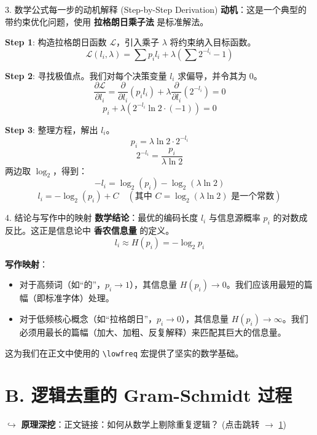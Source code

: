 \documentclass[11pt, a4paper]{ctexart}
\newcommand{\lowfreq}[1]{%
	{\Large\bfseries\color{red!60!black} #1}%
}
\newcommand{\mathlink}[2]{%
	\par\noindent\hspace*{2em}\small\color{blue!60!black}
	$\hookrightarrow$ \textbf{原理深挖}：#2 (点击跳转 $\to$ \ref{#1})
}
\begin{document}
	\newpage
	
	\begin{mathbox}{3. 数学公式每一步的动机解释 (Step-by-Step Derivation)}
		\textbf{动机}：这是一个典型的带约束优化问题，使用\lowfreq{拉格朗日乘子法}是标准解法。
		
		\textbf{Step 1}: 构造拉格朗日函数 $\mathcal{L}$，引入乘子 $\lambda$ 将约束纳入目标函数。
		$$ \mathcal{L}(l_i, \lambda) = \sum p_i l_i + \lambda \left( \sum 2^{-l_i} - 1 \right) $$
		
		\textbf{Step 2}: 寻找极值点。我们对每个决策变量 $l_i$ 求偏导，并令其为 0。
		$$ \frac{\partial \mathcal{L}}{\partial l_i} = \frac{\partial}{\partial l_i} (p_i l_i) + \lambda \frac{\partial}{\partial l_i} (2^{-l_i}) = 0 $$
		$$ p_i + \lambda (2^{-l_i} \ln 2 \cdot (-1)) = 0 $$
		
		\textbf{Step 3}: 整理方程，解出 $l_i$。
		$$ p_i = \lambda \ln 2 \cdot 2^{-l_i} $$
		$$ 2^{-l_i} = \frac{p_i}{\lambda \ln 2} $$
		两边取 $\log_2$，得到：
		$$ -l_i = \log_2(p_i) - \log_2(\lambda \ln 2) $$
		$$ l_i = -\log_2(p_i) + C \quad (\text{其中 } C = \log_2(\lambda \ln 2) \text{ 是一个常数}) $$
	\end{mathbox}
	
	\begin{mathbox}{4. 结论与写作中的映射}
		\textbf{数学结论}：最优的编码长度 $l_i$ 与信息源概率 $p_i$ 的对数成反比。这正是信息论中\lowfreq{香农信息量}的定义。
		$$ l_i \approx H(p_i) = -\log_2 p_i $$
		
		\textbf{写作映射}：
		\begin{itemize}
			\item 对于高频词（如“的”，$p_i \to 1$），其信息量 $H(p_i) \to 0$。我们应该用最短的篇幅（即标准字体）处理。
			\item 对于低频核心概念（如“拉格朗日”，$p_i \to 0$），其信息量 $H(p_i) \to \infty$。我们必须用最长的篇幅（加大、加粗、反复解释）来匹配其巨大的信息量。
		\end{itemize}
		这为我们在正文中使用的 \texttt{\textbackslash lowfreq} 宏提供了坚实的数学基础。
	\end{mathbox}
	
	\newpage
	
	\section{B. 逻辑去重的 Gram-Schmidt 过程} \label{math:ortho}
	\mathlink{math:ortho}{正文链接：如何从数学上剔除重复逻辑？}
	
\end{document}
